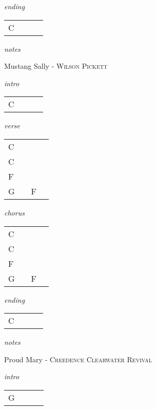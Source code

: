 \documentclass[12pt]{article}
\begin{document}
\textit{ending}

\begin{tabular}{|P{1.25in}|P{1.25in}|P{1.25in}|P{1.25in}|}
  C &   &   &   \\
\end{tabular}

\textit{notes}

\newpage

{\Huge Mustang Sally} {\huge - \textsc{Wilson Pickett}}

\huge
\textit{intro}

\begin{tabular}{|P{1.25in}|P{1.25in}|P{1.25in}|P{1.25in}|}
  C &   &   &   \\

\end{tabular}

\textit{verse}

\begin{tabular}{|P{1.25in}|P{1.25in}|P{1.25in}|P{1.25in}|}
  C &   &   &   \\
  C &   &   &   \\
  F &   &   &   \\
  G &   & F  &   \\
\end{tabular}

\textit{chorus}

\begin{tabular}{|P{1.25in}|P{1.25in}|P{1.25in}|P{1.25in}|}
  C &   &   &   \\
  C &   &   &   \\
  F &   &   &   \\
  G &   & F  &   \\
\end{tabular}

\textit{ending}

\begin{tabular}{|P{1.25in}|P{1.25in}|P{1.25in}|P{1.25in}|}
  C &   &   &   \\
\end{tabular}

\textit{notes}

\newpage

{\Huge Proud Mary} {\normalsize - \textsc{Creedence Clearwater Revival}}

\huge
\textit{intro}

\begin{tabular}{|P{1.25in}|P{1.25in}|P{1.25in}|P{1.25in}|}
  G &   &   &   \\
\end{tabular}
\end{document}
